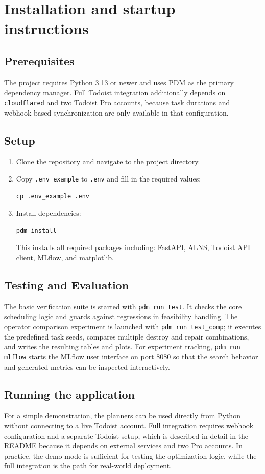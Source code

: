 \documentclass{article}
\begin{document}
\section{Installation and startup instructions}

\subsection{Prerequisites}
The project requires Python 3.13 or newer and uses PDM as the primary dependency manager. Full Todoist integration additionally depends on \texttt{cloudflared} and two Todoist Pro accounts, because task durations and webhook-based synchronization are only available in that configuration.

\subsection{Setup}
\begin{enumerate}
\item Clone the repository and navigate to the project directory.
\item Copy \texttt{.env\_example} to \texttt{.env} and fill in the required values:
\begin{verbatim}
cp .env_example .env
\end{verbatim}
\item Install dependencies:
\begin{verbatim}
pdm install
\end{verbatim}
This installs all required packages including: FastAPI, ALNS, Todoist API client, MLflow, and matplotlib.
\end{enumerate}

\subsection{Testing and Evaluation}
The basic verification suite is started with \texttt{pdm run test}. It checks the core scheduling logic and guards against regressions in feasibility handling. The operator comparison experiment is launched with \texttt{pdm run test\_comp}; it executes the predefined task seeds, compares multiple destroy and repair combinations, and writes the resulting tables and plots. For experiment tracking, \texttt{pdm run mlflow} starts the MLflow user interface on port 8080 so that the search behavior and generated metrics can be inspected interactively.

\subsection{Running the application}
For a simple demonstration, the planners can be used directly from Python without connecting to a live Todoist account. Full integration requires webhook configuration and a separate Todoist setup, which is described in detail in the README because it depends on external services and two Pro accounts. In practice, the demo mode is sufficient for testing the optimization logic, while the full integration is the path for real-world deployment.
\end{document}
